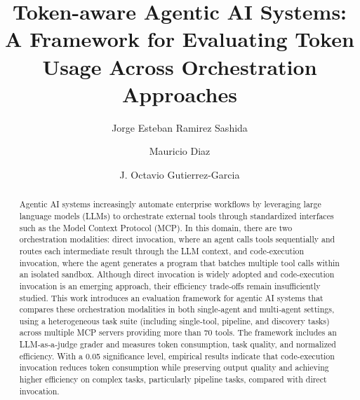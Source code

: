 \documentclass[runningheads]{llncs}
\begin{document}
\raggedbottom
\setlength{\textfloatsep}{10pt plus 2pt minus 4pt}
\setlength{\intextsep}{8pt plus 2pt minus 4pt}
%
\title{Token-aware Agentic AI Systems: A Framework for Evaluating Token Usage Across Orchestration Approaches}
%
%

\author{Jorge Esteban Ramirez Sashida
\and
Mauricio Diaz
\and
J. Octavio Gutierrez-Garcia
}
%
%
%


\maketitle              
%
\begin{abstract}

Agentic AI systems increasingly automate enterprise workflows by leveraging large language models (LLMs) to orchestrate external tools through standardized interfaces such as the Model Context Protocol (MCP). In this domain, there are two orchestration modalities: direct invocation, where an agent calls tools sequentially and routes each intermediate result through the LLM context, and code‑execution invocation, where the agent generates a program that batches multiple tool calls within an isolated sandbox. Although direct invocation is widely adopted and code-execution invocation is an emerging approach, their efficiency trade‑offs remain insufficiently studied. This work introduces an evaluation framework for agentic AI systems that compares these orchestration modalities in both single‑agent and multi‑agent settings, using a heterogeneous task suite (including single‑tool, pipeline, and discovery tasks) across multiple MCP servers providing more than 70 tools. The framework includes an LLM‑as‑a‑judge grader and measures token consumption, task quality, and normalized efficiency. With a 0.05 significance level, empirical results indicate that code-execution invocation reduces token consumption while preserving output quality and achieving higher efficiency on complex tasks, particularly pipeline tasks, compared with direct invocation.

\end{abstract}
\end{document}
